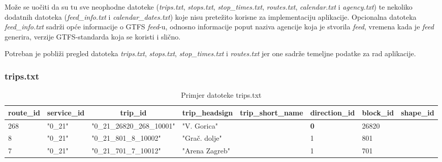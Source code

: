 \documentclass[zavrsnirad]{fer}
\begin{document}
Može se uočiti da su tu sve neophodne datoteke (\textit{trips.txt}, \textit{stops.txt}, \textit{stop\_times.txt}, \newline\textit{routes.txt}, \textit{calendar.txt} i \textit{agency.txt}) te nekoliko dodatnih datoteka (\textit{feed\_info.txt} i \newline\textit{calendar\_dates.txt}) koje nisu pretežito korisne za implementaciju aplikacije. Opcionalna datoteka \textit{feed\_info.txt} sadrži opće informacije o GTFS \textit{feed}-u, odnosno  informacije poput naziva agencije koja je stvorila \textit{feed}, vremena kada je \textit{feed} generira, verzije GTFS-standarda koja se koristi i slično.

Potreban je pobliži pregled datoteka \textit{trips.txt}, \textit{stops.txt}, \textit{stop\_times.txt} i \textit{routes.txt} jer one sadrže temeljne podatke za rad aplikacije.

\subsubsection{trips.txt}

\begin{table}[htb]
	\begin{adjustbox}{width=\columnwidth,center}
	\begin{tabular}{l|l|l|l|l|l|l|l}
		\hline
		\multicolumn{1}{c|}{\textbf{route\_id}} & \multicolumn{1}{c|}{\textbf{service\_id}} & \multicolumn{1}{c|}{\textbf{trip\_id}} & \multicolumn{1}{c|}{\textbf{trip\_headsign}} & \multicolumn{1}{c|}{\textbf{trip\_short\_name}} & \multicolumn{1}{c|}{\textbf{direction\_id}} & \multicolumn{1}{c|}{\textbf{block\_id}} & \multicolumn{1}{c}{\textbf{shape\_id}} \\ \hline
		268 & "0\_21" & "0\_21\_26820\_268\_10001" & "V. Gorica" &  & \textbf{0} & 26820 &  \\ \hline
		8 & "0\_21" & "0\_21\_801\_8\_10002" & "Grač. dolje" & \textbf{} & 1 & 801 &  \\ \hline
		7 & "0\_21" & "0\_21\_701\_7\_10012" & "Arena Zagreb" & \textbf{} & 1 & 701 &  \\ \hline
	\end{tabular}
	\end{adjustbox}
	\caption{Primjer datoteke trips.txt}
	\label{tbl:trips}
\end{table}
\end{document}
